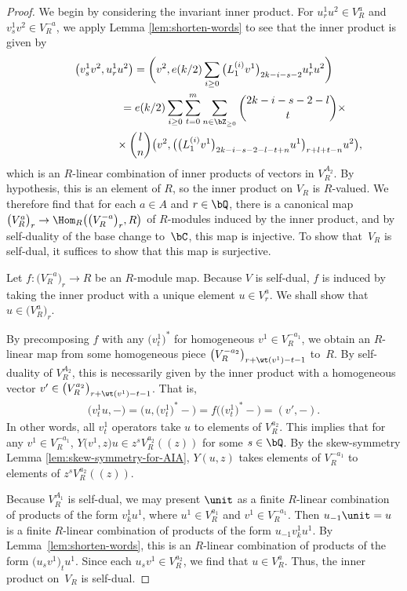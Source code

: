 \begin{proof}
We begin by considering the invariant inner product. For $u^1_r u^2 \in V^a_R$ and $v^1_s v^2 \in V^{-a}_R$, we apply Lemma \ref{lem:shorten-words} to see that the inner product is given by
\begin{gather*}
\big(v^1_s v^2, u^1_r u^2\big) = \bigg(v^2, e(k/2) \sum_{i \geq 0} \big(L_1^{(i)} v^1\big)_{2k-i-s-2} u^1_r u^2\bigg) \\
\hphantom{\big(v^1_s v^2, u^1_r u^2\big)}{} = e(k/2) \sum_{i \geq 0} \sum_{t=0}^m \sum_{n \in \bZ_{\geq 0}} \binom{2k-i-s-2-l}{t} \times \\
\hphantom{\big(v^1_s v^2, u^1_r u^2\big)=}{} \times \binom{l}{n} \big(v^2, \big(\big(L_1^{(i)} v^1\big)_{2k-i-s-2-l-t+n}u^1\big)_{r+l+t-n} u^2\big),
\end{gather*}
which is an $R$-linear combination of inner products of vectors in $V^{A_2}_R$. By hypothesis, this is an element of $R$, so the inner product on $V_R$ is $R$-valued. We therefore find that for each $a \in A$ and $r \in \bQ$, there is a canonical map $\big(V^a_R\big)_r \to \Hom_R\big(\big(V^{-a}_R\big)_r, R\big)$ of $R$-modules induced by the inner product, and by self-duality of the base change to~$\bC$, this map is injective. To show that~$V_R$ is self-dual, it suffices to show that this map is surjective.

Let $f\colon \big(V^{-a}_R\big)_r \to R$ be an $R$-module map. Because $V$ is self-dual, $f$ is induced by taking the inner product with a unique element $u \in V^a_r$. We shall show that $u \in \big(V^a_R\big)_r$.

By precomposing $f$ with any $\big(v^1_t\big)^*$ for homogeneous $v^1 \in V^{-a_1}_R$, we obtain an $R$-linear map from some homogeneous piece $\big(V^{-a_2}_R\big)_{r+\wt(v^1)-t-1}$ to~$R$. By self-duality of $V^{A_2}_R$, this is necessarily given by the inner product with a homogeneous vector $v' \in \big(V^{a_2}_R\big)_{r+\wt(v^1)-t-1}$. That is,
\begin{gather*} \big(v^1_t u, -\big) = \big(u, \big(v^1_t\big)^* -\big) = f\big(\big(v^1_t\big)^* -\big) = (v',-). \end{gather*}
In other words, all $v^1_t$ operators take $u$ to elements of $V^{a_2}_R$. This implies that for any $v^1 \in V^{-a_1}_R$, $Y\big(v^1,z\big)u \in z^s V^{a_2}_R((z))$ for some $s \in \bQ$. By the skew-symmetry Lemma \ref{lem:skew-symmetry-for-AIA}, $Y(u,z)$ takes elements of $V^{-a_1}_R$ to elements of $z^sV^{a_2}_R((z))$.

Because $V^{A_1}_R$ is self-dual, we may present $\unit$ as a finite $R$-linear combination of products of the form $v^1_k u^1$, where $u^1 \in V^{a_1}_R$ and $v^1 \in V^{-a_1}_R$. Then $u_{-1} \unit = u$ is a finite $R$-linear combination of products of the form $u_{-1} v^1_k u^1$. By Lemma~\ref{lem:shorten-words}, this is an $R$-linear combination of products of the form $\big(u_s v^1\big)_t u^1$. Since each $u_s v^1 \in V^{a_2}_R$, we find that $u \in V^a_R$. Thus, the inner product on~$V_R$ is self-dual.


\end{proof}
